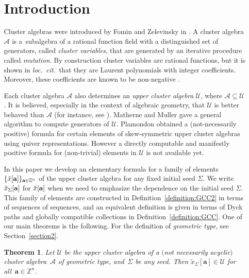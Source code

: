 \documentclass[pdftex]{sigma}
\numberwithin{equation}{section}
\newtheorem{Theorem}{Theorem}[section]
\begin{document}
\section{Introduction}
Cluster algebras were introduced by Fomin and Zelevinsky in \cite{FZ1}. A cluster algebra $\mathcal{A}$ is a~subalgebra of a rational function f\/ield with a distinguished set of generators, called \emph{cluster variables}, that are generated by an iterative procedure called \emph{mutation}. By construction cluster variables are rational functions, but it is shown in \emph{loc.~cit.}~that  they are Laurent
polynomials with integer coef\/f\/icients. Moreover, these coef\/f\/icients are known to be non-negative \cite{GHKK, LS}.

Each cluster algebra $\mathcal{A}$ also determines an \emph{upper cluster algebra} $\mathcal{U}$, where $\mathcal{A}\subseteq \mathcal{U}$ \cite{BFZ}. It is believed, especially in the context of algebraic geometry, that $\mathcal{U}$ is better behaved than  $\mathcal{A}$ (for instance, see \cite{BMRS, GHK, GHKK}). Matherne and Muller \cite{MM} gave a general algorithm to compute generators of $\mathcal{U}$. Plamondon \cite{P1,P2} obtained a (not-necessarily positive) formula for certain elements of skew-symmetric upper cluster algebras using quiver representations.    However a directly computable and manifestly positive formula for (non-trivial) elements in $\mathcal{U}$ is not available yet.

In this paper we develop an elementary formula for a family of elements $\{\tilde{x}[{\bf a}]\}_{{\bf a}\in\mathbb{Z}^n}$ of the upper cluster algebra for any f\/ixed initial seed $\Sigma$. We write $\tilde{x}_\Sigma[{\bf a}]$ for $\tilde{x}[{\bf a}]$ when we need to emphasize the dependence on the initial seed $\Sigma$.
This family of elements are constructed in Def\/inition~\ref{definition:GCC2} in terms of sequences of sequences, and an equivalent def\/inition is given in terms of Dyck paths and globally compatible collections in Def\/inition~\ref{definition:GCC}.
One of our main theorems is the following. For the def\/inition of {\it geometric type}, see Section~\ref{section2}.

\begin{Theorem}\label{thm:x[a]}
Let $\mathcal{U}$ be the upper cluster algebra of a $($not necessarily acyclic$)$ cluster algebra~$\mathcal{A}$ of geometric type, and~$\Sigma$ be any seed. Then  $\tilde{x}_\Sigma[\mathbf{a}]\in\mathcal{U}$ for all~$\mathbf{a}\in \mathbb{Z}^n$.
\end{Theorem}
\end{document}
